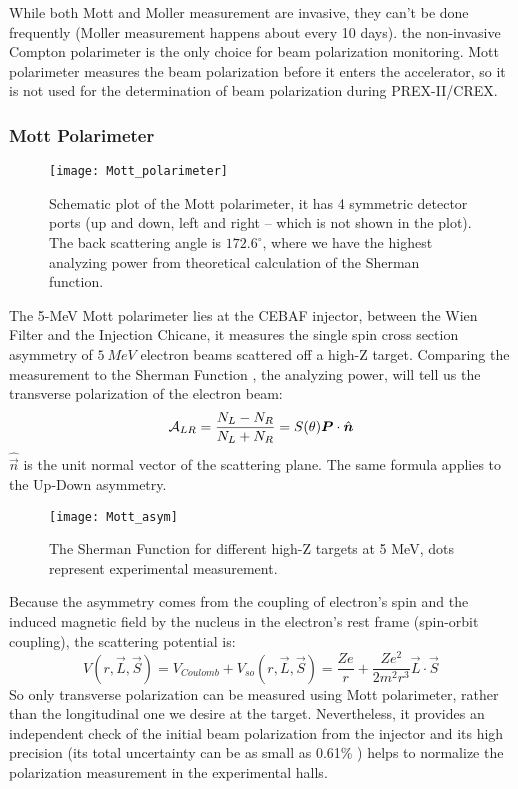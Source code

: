 While both Mott and Moller measurement are invasive, they can't be done frequently
(Moller measurement happens about every 10 days).
the non-invasive Compton polarimeter is the only choice for beam polarization monitoring. 
Mott polarimeter measures the beam polarization before it enters the accelerator, 
so it is not used for the determination of beam polarization during PREX-II/CREX.

\subsubsection{Mott Polarimeter}
\begin{figure}
    \centering
    \texttt{[image: Mott\_polarimeter]}
    \caption{Schematic plot of the Mott polarimeter, it has 4 symmetric detector
    ports (up and down, left and right -- which is not shown in the plot). 
    The back scattering angle is $172.6^\circ$, where we have the
    highest analyzing power from theoretical calculation of the Sherman function.
    \cite{PhysRevC.102.015501}}
\end{figure}
The 5-MeV Mott polarimeter lies at the CEBAF injector, between the Wien Filter
and the Injection Chicane, it measures the single spin cross section asymmetry
of $5\ MeV$ electron beams scattered off a high-Z target. Comparing the measurement
to the Sherman Function \cite{PhysRev.103.1601}, the analyzing power, will tell
us the transverse polarization of the electron beam:
\begin{equation}
    \mathcal{A}_{LR} = \frac{N_L - N_R}{N_L + N_R} = S(\theta)\boldsymbol{P}\cdot \hat{\boldsymbol{n}}
\end{equation}
$\hat{\vec{n}}$ is the unit normal vector of the scattering plane. The same formula
applies to the Up-Down asymmetry.
\begin{figure}
    \centering
    \texttt{[image: Mott\_asym]}
    \caption{The Sherman Function for different high-Z targets at 5 MeV, dots
    represent experimental measurement.}
\end{figure}
Because the asymmetry comes from the coupling of electron's spin and the induced
magnetic field by the nucleus in the electron's rest frame (spin-orbit coupling), 
the scattering potential is:
\begin{equation}
    V(r, \vec{L}, \vec{S}) = V_{Coulomb} + V_{so} (r, \vec{L}, \vec{S}) = \frac{Ze}{r} + \frac{Ze^2}{2m^2r^3}\vec{L}\cdot \vec{S}
\end{equation}
So only transverse polarization can be measured using Mott polarimeter, rather
than the longitudinal one we desire at the target. Nevertheless, it provides an
independent check of the initial beam polarization from the injector and its high
precision (its total uncertainty can be as small as 0.61\% \cite{PhysRevC.102.015501}) 
helps to normalize the polarization measurement in the experimental halls.

